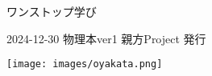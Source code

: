 \clearpage{\thispagestyle{empty}}
\vspace{220pt}

\begin{center}


\begin{sffamily}
\Large
ワンストップ学び
\normalsize
\end{sffamily}
\vspace{320pt}

\begin{sffamily}
2024-12-30
\hspace{5pt}
物理本ver1
\hspace{5pt}
親方Project
\hspace{5pt}
発行
\vspace{10pt}
\end{sffamily}

\texttt{[image: images/oyakata.png]}

\end{center}
